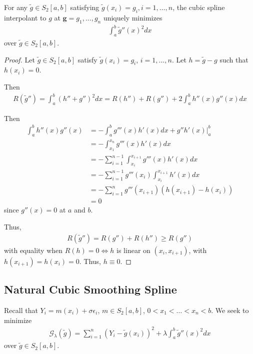 \begin{thm}
  \label{defn:nonparametric_regression:3}
  For any $\tilde g \in S_{2}[a, b]$ satisfying $\tilde g(x_{i})=
  g_{i}, i=1, \dots, n$, the cubic spline interpolant to $g$ at
  $\mathbf{g} = g_{1}, \dots, g_{n}$ uniquely minimizes
  \begin{align}
    \label{eq:66}
    \int_{a}^{b} \tilde g''(x)^{2} dx
  \end{align} over $\tilde g \in S_{2}[a, b]$.
\end{thm}

\begin{proof}
  Let $\tilde g \in S_{2}[a,b]$ satisfy $\tilde g(x_{i}) = g_{i}$, $i
  = 1, \dots, n$.  Let $h = \tilde g  - g$ such that $h(x_{i}) = 0$.

  Then
  \begin{align}
    \label{eq:67}
    R(\tilde g'') = \int_{a}^{b} (h'' + g'')^{2} dx = R(h'')+ R(g'') +
    2 \int_{a}^{b} h''(x) g''(x) dx
  \end{align}

  Then
  \begin{align}
    \label{eq:68}
    \int_{a}^{b} h''(x) g''(x) &= -\int_{a}^{b} g'''(x) h'(x) dx +
    g''h'(x)|_{a}^{b} \\
    &= -\int_{x_{1}}^{x_{n}} g'''(x) h'(x) dx \\
    &= -\sum_{i=1}^{n-1} \int_{x_{i}}^{x_{i+1}} g'''(x) h'(x) dx \\
    &= -\sum_{i=1}^{n-1} g'''(x_{i}) \int_{x_{i}}^{x_{i+1}} h'(x) dx  \\
    &= -\sum_{i=1}^{n} g'''(x_{i+1}) (h(x_{i+1})- h(x_{i})) \\
    &= 0
  \end{align} since $g''(x) = 0$ at $a$ and $b$.

  Thus,
  \begin{align}
    \label{eq:69}
    R(\tilde g'') = R(g'') + R(h'') \geq R(g'')
  \end{align}
  with equality when $R(h) = 0 \iff h$ is linear on $(x_{i},
  x_{i+1})$, with $h(x_{i+1}) = h(x_{i}) = 0$.  Thus, $h \equiv 0$.
\end{proof}

\subsection{Natural Cubic Smoothing Spline}
\label{sec:natur-cubic-smooth}

Recall that $Y_{i} = m(x_{i}) + \sigma \epsilon_{i}$, $m \in
S_{2}[a,b]$, $0 < x_{1} < \dots < x_{n} < b$.  We seek to minimize
\begin{align}
  \label{eq:70}
  \mathcal{G}_{\lambda}(\tilde g) = \sum_{i=1}^{n} (Y_{i} - \tilde
  g(x_{i}))^{2} + \lambda \int_{a}^{b}  \tilde g''(x)^{2} dx
\end{align} over $\tilde g \in S_{2}[a, b]$.


